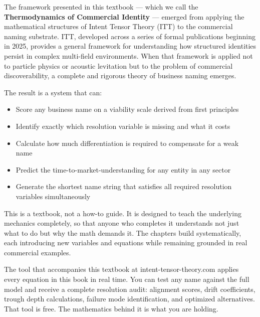 \documentclass[12pt, openany]{book}
\theoremstyle{thmstyle}
\theoremstyle{defstyle}
\begin{document}
\vspace{8pt}

The framework presented in this textbook --- which we call the \textbf{Thermodynamics of Commercial Identity} --- emerged from applying the mathematical structures of Intent Tensor Theory (ITT) to the commercial naming substrate. ITT, developed across a series of formal publications beginning in 2025, provides a general framework for understanding how structured identities persist in complex multi-field environments. When that framework is applied not to particle physics or acoustic levitation but to the problem of commercial discoverability, a complete and rigorous theory of business naming emerges.

The result is a system that can:

\begin{itemize}[leftmargin=1.5em]
  \item Score any business name on a viability scale derived from first principles
  \item Identify exactly which resolution variable is missing and what it costs
  \item Calculate how much differentiation is required to compensate for a weak name
  \item Predict the time-to-market-understanding for any entity in any sector
  \item Generate the shortest name string that satisfies all required resolution variables simultaneously
\end{itemize}

\vspace{8pt}

This is a textbook, not a how-to guide. It is designed to teach the underlying mechanics completely, so that anyone who completes it understands not just what to do but why the math demands it. The chapters build systematically, each introducing new variables and equations while remaining grounded in real commercial examples.

The tool that accompanies this textbook at intent-tensor-theory.com applies every equation in this book in real time. You can test any name against the full model and receive a complete resolution audit: alignment scores, drift coefficients, trough depth calculations, failure mode identification, and optimized alternatives. That tool is free. The mathematics behind it is what you are holding.

\vspace{8pt}
\end{document}

